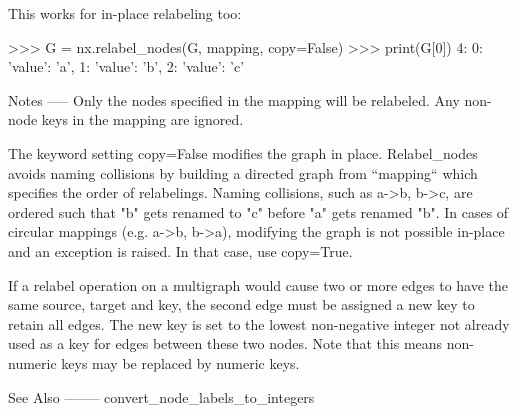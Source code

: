 \begin{DoxyVerb}
This works for in-place relabeling too:

>>> G = nx.relabel_nodes(G, mapping, copy=False)
>>> print(G[0])
{4: {0: {'value': 'a'}, 1: {'value': 'b'}, 2: {'value': 'c'}}}

Notes
-----
Only the nodes specified in the mapping will be relabeled.
Any non-node keys in the mapping are ignored.

The keyword setting copy=False modifies the graph in place.
Relabel_nodes avoids naming collisions by building a
directed graph from ``mapping`` which specifies the order of
relabelings. Naming collisions, such as a->b, b->c, are ordered
such that "b" gets renamed to "c" before "a" gets renamed "b".
In cases of circular mappings (e.g. a->b, b->a), modifying the
graph is not possible in-place and an exception is raised.
In that case, use copy=True.

If a relabel operation on a multigraph would cause two or more
edges to have the same source, target and key, the second edge must
be assigned a new key to retain all edges. The new key is set
to the lowest non-negative integer not already used as a key
for edges between these two nodes. Note that this means non-numeric
keys may be replaced by numeric keys.

See Also
--------
convert_node_labels_to_integers
\end{DoxyVerb}
 